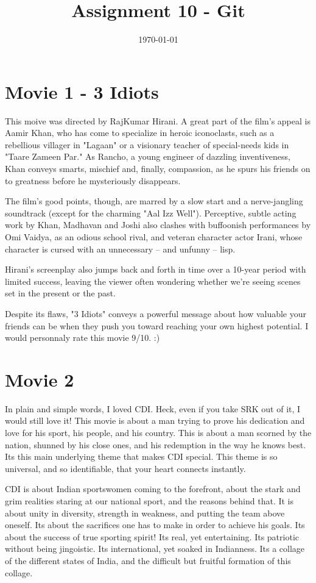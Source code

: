 \documentclass[]{article}
\title{Assignment 10 - Git}
\date{\today}
\begin{document}
\maketitle
\section{Movie 1 - 3 Idiots}
This moive was directed by RajKumar Hirani.
A great part of the film's appeal is Aamir Khan, who has come to specialize in heroic iconoclasts, such as a rebellious villager in "Lagaan" or a visionary teacher of special-needs kids in "Taare Zameen Par." As Rancho, a young engineer of dazzling inventiveness, Khan conveys smarts, mischief and, finally, compassion, as he spurs his friends on to greatness before he mysteriously disappears.

The film's good points, though, are marred by a slow start and a nerve-jangling soundtrack (except for the charming "Aal Izz Well"). Perceptive, subtle acting work by Khan, Madhavan and Joshi also clashes with buffoonish performances by Omi Vaidya, as an odious school rival, and veteran character actor Irani, whose character is cursed with an unnecessary -- and unfunny -- lisp.

Hirani's screenplay also jumps back and forth in time over a 10-year period with limited success, leaving the viewer often wondering whether we're seeing scenes set in the present or the past.

Despite its flaws, "3 Idiots" conveys a powerful message about how valuable your friends can be when they push you toward reaching your own highest potential.
I would personnaly rate this movie 9/10. :)

\section{Movie 2}
In plain and simple words, I loved CDI. Heck, even if you take SRK out of it, I would still love it! This movie is about a man trying to prove his dedication and love for his sport, his people, and his country. This is about a man scorned by the nation, shunned by his close ones, and his redemption in the way he knows best. Its this main underlying theme that makes CDI special. This theme is so universal, and so identifiable, that your heart connects instantly.

CDI is about Indian sportswomen coming to the forefront, about the stark and grim realities staring at our national sport, and the reasons behind that. It is about unity in diversity, strength in weakness, and putting the team above oneself. Its about the sacrifices one has to make in order to achieve his goals. Its about the success of true sporting spirit! Its real, yet entertaining. Its patriotic without being jingoistic. Its international, yet soaked in Indianness. Its a collage of the different states of India, and the difficult but fruitful formation of this collage.
\end{document}
